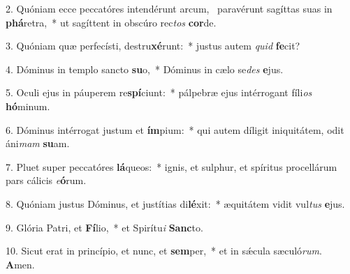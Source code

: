 2. Quóniam ecce peccatóres intendérunt arcum, \dag\  paravérunt sagíttas suas in \textbf{phá}retra,~*  ut sagíttent in obscúro rec\textit{tos} \textbf{cor}de.\

3. Quóniam quæ perfecísti, destru\textbf{xé}runt:~*  justus autem \textit{quid} \textbf{fe}cit?\

4. Dóminus in templo sancto \textbf{su}o,~*  Dóminus in cælo se\textit{des} \textbf{e}jus.\

5. Oculi ejus in páuperem re\textbf{spí}ciunt:~*  pálpebræ ejus intérrogant fíli\textit{os} \textbf{hó}minum.\

6. Dóminus intérrogat justum et \textbf{ím}pium:~*  qui autem díligit iniquitátem, odit áni\textit{mam} \textbf{su}am.\

7. Pluet super peccatóres \textbf{lá}queos:~*  ignis, et sulphur, et spíritus procellárum pars cálicis \textit{e}\textbf{ó}rum.\

8. Quóniam justus Dóminus, et justítias di\textbf{lé}xit:~*  æquitátem vidit vul\textit{tus} \textbf{e}jus.\

9. Glória Patri, et \textbf{Fí}lio,~*  et Spirítu\textit{i} \textbf{Sanc}to.\

10. Sicut erat in princípio, et nunc, et \textbf{sem}per,~*  et in sǽcula sæculó\textit{rum}. \textbf{A}men.\

